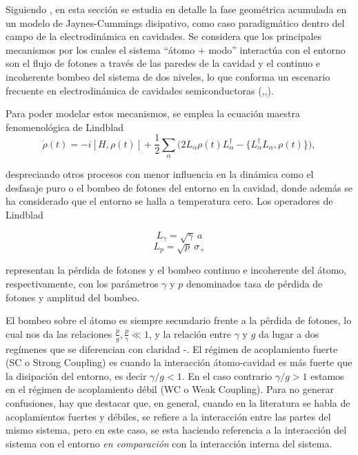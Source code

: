 Siguiendo \cite{Viotti2022}, en esta sección se estudia en detalle la fase geométrica acumulada en un modelo de Jaynes-Cummings disipativo, como caso paradigmático dentro del campo de la electrodinámica en cavidades. Se considera que los principales mecanismos por los cuales el sistema “átomo + modo” interactúa con el entorno son el flujo de fotones a través de las paredes de la cavidad y el continuo e incoherente bombeo del sistema de dos niveles, lo que conforma un escenario frecuente en electrodinámica de cavidades semiconductoras (\cite{Khitrova2006},\cite{Laussy2009},\cite{DelValle2009}). 

Para poder modelar estos mecanismos, se emplea la ecuación maestra fenomenológica de Lindblad
\begin{equation}\label{eq3:lindblad}
\dot{\rho}(t) = -i [H, \rho(t)] + \frac{1}{2} \sum_\alpha \big( 2L_\alpha \rho(t) L_\alpha^{\dagger} - \{ L_\alpha^{\dagger}L_\alpha, \rho(t) \} \big),
\end{equation}

despreciando otros procesos con menor influencia en la dinámica como el desfasaje puro o el bombeo de fotones del entorno en la cavidad, donde además se ha considerado que el entorno se halla a temperatura cero. Los operadores de Lindblad

\begin{equation}
L_\gamma = \sqrt{\gamma} \ a
\end{equation}
\begin{equation}
L_p = \sqrt{p} \ \sigma_+
\end{equation}

representan la pérdida de fotones y el bombeo continuo e incoherente del átomo, respectivamente, con los parámetros $\gamma$ y $p$ denominados tasa de pérdida de fotones y amplitud del bombeo. 

El bombeo sobre el átomo es siempre secundario frente a la pérdida de fotones, lo cual nos da las relaciones $\frac{p}{g},\frac{p}{\gamma} \ll 1$, y la relación entre $\gamma$ y $g$ da lugar a dos regímenes que se diferencian con claridad \cite{Carmi1989}-\cite{Lodhal2015}. El régimen de acoplamiento fuerte (SC o Strong Coupling) es cuando la interacción átomo-cavidad es más fuerte que la disipación del entorno, es decir $\gamma /g <1$. En el caso contrario $\gamma/g>1$ estamos en el régimen de acoplamiento débil (WC o Weak Coupling). Para no generar confusiones, hay que destacar que, en general, cuando en la literatura se habla de acoplamientos fuertes y débiles, se refiere a la interacción entre las partes del mismo sistema, pero en este caso, se esta haciendo referencia a la interacción del sistema con el entorno \textit{en comparación} con la interacción interna del sistema.
